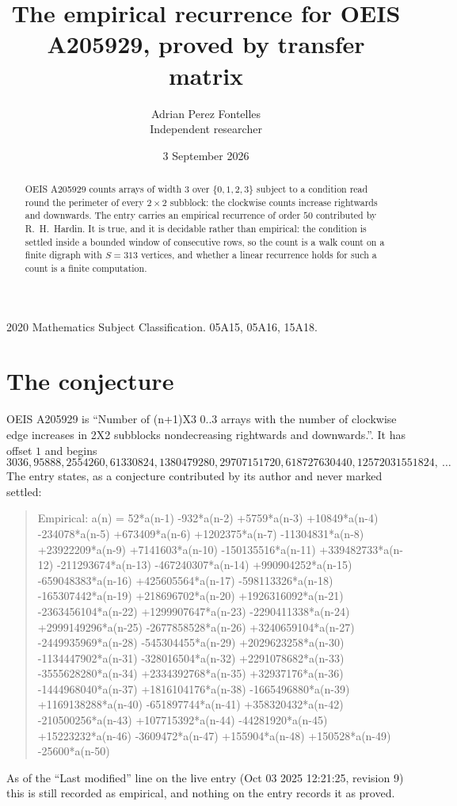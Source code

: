 \documentclass[11pt,a4paper]{article}
\title{The empirical recurrence for OEIS A205929, proved by transfer matrix}
\author{Adrian Perez Fontelles\\ \small Independent researcher}
\date{3 September 2026}
\theoremstyle{plain}
\theoremstyle{definition}
\begin{document}
\maketitle

\begin{abstract}
OEIS A205929 counts arrays of width $3$ over $\{0,1,2,3\}$ subject to a condition read round the
perimeter of every $2\times2$ subblock: the clockwise counts increase rightwards and downwards. The entry carries an empirical recurrence of
order $50$ contributed by R.~H.~Hardin. It is true, and it is decidable rather than
empirical: the condition is settled inside a bounded window of consecutive rows, so the
count is a walk count on a finite digraph with $S=313$ vertices, and whether a linear
recurrence holds for such a count is a finite computation.
\end{abstract}

\noindent\small 2020 Mathematics Subject Classification. 05A15, 05A16, 15A18.\normalsize

\section{The conjecture}

OEIS A205929 is ``Number of (n+1)X3 0..3 arrays with the number of clockwise edge increases in 2X2 subblocks nondecreasing rightwards and downwards.''. It has offset $1$ and begins
\[
3036, 95888, 2554260, 61330824, 1380479280, 29707151720, 618727630440, 12572031551824,\ \dots
\]
The entry states, as a conjecture contributed by its author and never marked settled:
\begin{quote}
Empirical: a(n) = 52*a(n-1) -932*a(n-2) +5759*a(n-3) +10849*a(n-4) -234078*a(n-5) +673409*a(n-6) +1202375*a(n-7) -11304831*a(n-8) +23922209*a(n-9) +7141603*a(n-10) -150135516*a(n-11) +339482733*a(n-12) -211293674*a(n-13) -467240307*a(n-14) +990904252*a(n-15) -659048383*a(n-16) +425605564*a(n-17) -598113326*a(n-18) -165307442*a(n-19) +218696702*a(n-20) +1926316092*a(n-21) -2363456104*a(n-22) +1299907647*a(n-23) -2290411338*a(n-24) +2999149296*a(n-25) -2677858528*a(n-26) +3240659104*a(n-27) -2449935969*a(n-28) -545304455*a(n-29) +2029623258*a(n-30) -1134447902*a(n-31) -328016504*a(n-32) +2291078682*a(n-33) -3555628280*a(n-34) +2334392768*a(n-35) +32937176*a(n-36) -1444968040*a(n-37) +1816104176*a(n-38) -1665496880*a(n-39) +1169138288*a(n-40) -651897744*a(n-41) +358320432*a(n-42) -210500256*a(n-43) +107715392*a(n-44) -44281920*a(n-45) +15223232*a(n-46) -3609472*a(n-47) +155904*a(n-48) +150528*a(n-49) -25600*a(n-50)
\end{quote}
As of the ``Last modified'' line on the live entry (Oct 03 2025 12:21:25, revision 9) this is still
recorded as empirical, and nothing on the entry records it as proved.
\end{document}
